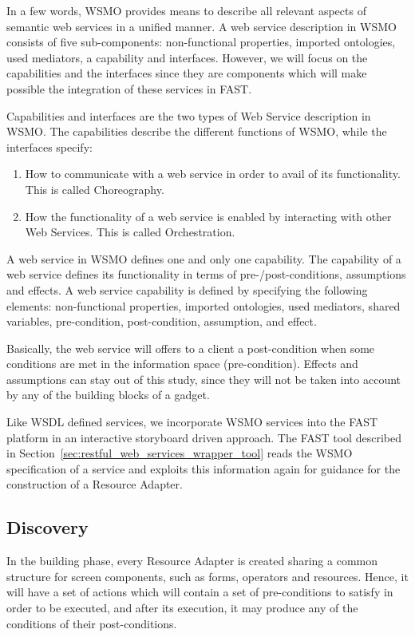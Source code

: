 \documentclass{fast_latex}
\begin{document}
In a few words, WSMO provides means to describe all relevant aspects of semantic web services in a unified manner. A web service description in WSMO consists of five sub-components: non-functional properties, imported ontologies, used mediators, a capability and interfaces. However, we will focus on the capabilities and the interfaces since they are components which will make possible the integration of these services in FAST.

Capabilities and interfaces are the two types of Web Service description in WSMO. The capabilities describe the different functions of WSMO, while the interfaces specify:
\begin{enumerate}
	\item How to communicate with a web service in order to avail of its functionality. This is called Choreography.
	\item How the functionality of a web service is enabled by interacting with other Web Services. This is called Orchestration.
\end{enumerate}

A web service in WSMO defines one and only one capability. The capability of a web service defines its functionality in terms of pre-/post-conditions, assumptions and effects. A web service capability is defined by specifying the following elements: non-functional properties, imported ontologies, used mediators, shared variables, pre-condition, post-condition, assumption, and effect.

Basically, the web service will offers to a client a post-condition when some conditions are met in the information space (pre-condition). Effects and assumptions can stay out of this study, since they will not be taken into account by any of the building blocks of a gadget.

Like WSDL defined services, we incorporate WSMO services into the FAST platform in an interactive storyboard driven approach. The FAST tool described in Section~\ref{sec:restful_web_services_wrapper_tool} reads the WSMO specification of a service and exploits this information again for guidance for the construction of a Resource Adapter. 


\subsection{Discovery} %
\label{sub:discovery}

In the building phase, every Resource Adapter is created sharing a common structure for screen components, such as forms, operators and resources. Hence, it will have a set of actions which will contain a set of pre-conditions to satisfy in order to be executed, and after its execution, it may produce any of the conditions of their post-conditions.
\end{document}

